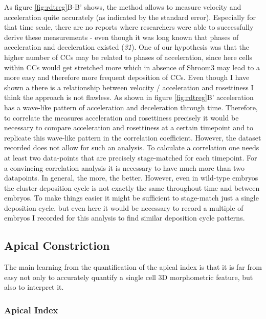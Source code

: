 \documentclass[11pt,singlespacinge,twoside]{reedthesis} %
\theoremstyle{definition}
\theoremstyle{definition}
\theoremstyle{definition}
\theoremstyle{remark}
\begin{document}
As figure \ref{fig:rdtreg}B-B' shows, the method allows to measure velocity and acceleration quite accurately (as indicated by the standard error). Especially for that time scale, there are no reports where researchers were able to successfully derive these measurements - even though it was long known that phases of acceleration and deceleration existed (\emph{31}). One of our hypothesis was that the higher number of CCs may be related to phases of acceleration, since here cells within CCs would get stretched more which in absence of Shroom3 may lead to a more easy and therefore more frequent deposition of CCs. Even though I have shown a there is a relationship between velocity / acceleration and rosettiness I think the approach is not flawless. As shown in figure \ref{fig:rdtreg}B' acceleration has a wave-like pattern of acceleration and deceleration through time. Therefore, to correlate the measures acceleration and rosettiness precisely it would be necessary to compare acceleration and rosettiness at a certain timepoint and to replicate this wave-like pattern in the correlation coefficient. However, the dataset recorded does not allow for such an analysis. To calculate a correlation one needs at least two data-points that are precisely stage-matched for each timepoint. For a convincing correlation analysis it is necessary to have much more than two datapoints. In general, the more, the better. However, even in wild-type embryos the cluster deposition cycle is not exactly the same throughout time and between embryos. To make things easier it might be sufficient to stage-match just a single deposition cycle, but even here it would be necessary to record a multiple of embryos I recorded for this analysis to find similar deposition cycle patterns.

\hypertarget{apical-constriction-4}{%
\subsection{Apical Constriction}\label{apical-constriction-4}}

The main learning from the quantification of the apical index is that it is far from easy not only to accurately quantify a single cell 3D morphometric feature, but also to interpret it.

\hypertarget{apical-index}{%
\subsubsection{Apical Index}\label{apical-index}}
\end{document}
